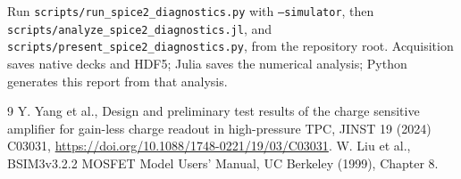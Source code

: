 \documentclass[11pt,a4paper]{article}
\begin{document}
Run \texttt{scripts/run\_spice2\_diagnostics.py} with \texttt{--simulator},
then \texttt{scripts/analyze\_spice2\_diagnostics.jl}, and
\texttt{scripts/present\_spice2\_diagnostics.py}, from the repository root.
Acquisition saves native decks and HDF5; Julia saves the numerical analysis;
Python generates this report from that analysis.

\begin{thebibliography}{9}
 Y. Yang et al., Design and preliminary test results of the
charge sensitive amplifier for gain-less charge readout in high-pressure TPC,
JINST 19 (2024) C03031, \url{https://doi.org/10.1088/1748-0221/19/03/C03031}.
 W. Liu et al., BSIM3v3.2.2 MOSFET Model Users' Manual,
UC Berkeley (1999), Chapter 8.
\end{thebibliography}
\end{document}
